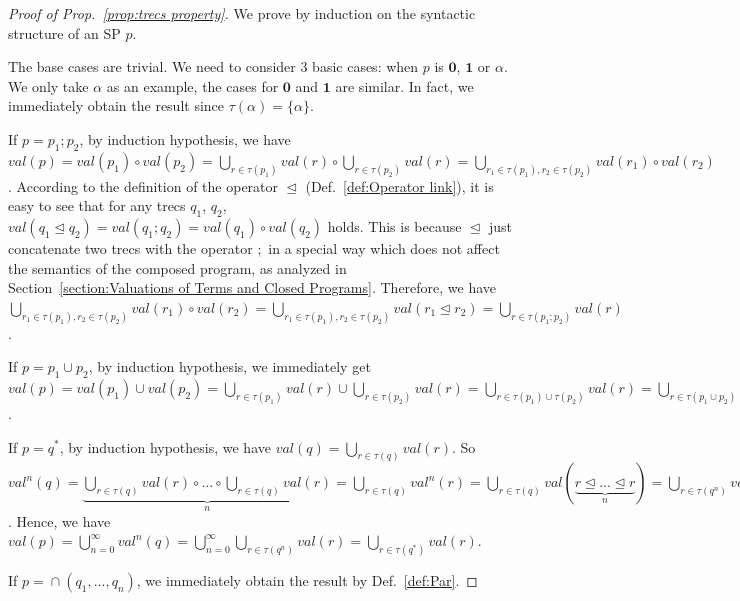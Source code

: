 \documentclass{fcs}
\newcommand{\noth}[0]{\mathbf{1}}
\newcommand{\halt}[0]{\mathbf{0}}
\newcommand{\val}[0]{\mathit{val}}
\DeclareMathOperator{\seq}{;}
\DeclareMathOperator{\para}{\cap}
\DeclareMathOperator{\link}{\unlhd}
\begin{document}
\begin{proof}[Proof of Prop.~\ref{prop:trecs property}]
    We prove by induction on the syntactic structure of an SP $p$.

    The base cases are trivial.
    We need to consider 3 basic cases: when $p$ is $\halt$, $\noth$ or $\alpha$.
    We only take $\alpha$ as an example, the cases for $\halt$ and $\noth$ are similar.
    In fact, we immediately obtain the result since $\tau(\alpha) = \{\alpha\}$.

    If $p = p_1\seq p_2$, by induction hypothesis, we have $\val(p) = \val(p_1)\circ \val(p_2) = \bigcup_{r\in \tau(p_1)}\val(r) \circ \bigcup_{r\in \tau(p_2)}\val(r)=\bigcup_{r_1\in \tau(p_1), r_2\in \tau(p_2)}\val(r_1)\circ \val(r_2)$.
    According to the definition of the operator $\link$ (Def.~\ref{def:Operator link}), it is easy to see that for any trecs $q_1$, $q_2$, $\val(q_1\link q_2)= \val(q_1\seq q_2) = \val(q_1)\circ \val(q_2)$ holds.
    This is because $\link$ just concatenate two trecs with the operator $\seq$ in a special way which does not affect the semantics of the composed program, as analyzed in Section~\ref{section:Valuations of Terms and Closed Programs}.
    Therefore, we have $\bigcup_{r_1\in \tau(p_1), r_2\in \tau(p_2)}\val(r_1)\circ \val(r_2) = \bigcup_{r_1\in \tau(p_1), r_2\in \tau(p_2)}\val(r_1\link r_2) = \bigcup_{r\in \tau(p_1\seq p_2)}\val(r)$.

    If $p=p_1\cup p_2$, by induction hypothesis, we immediately get $\val(p) = \val(p_1)\cup \val(p_2) = \bigcup_{r\in \tau(p_1)}\val(r)\cup \bigcup_{r\in \tau(p_2)}\val(r) = \bigcup_{r\in \tau(p_1)\cup \tau(p_2)}\val(r) = \bigcup_{r\in \tau(p_1\cup p_2)}\val(r)$.

    If $p=q^*$, by induction hypothesis, we have $\val(q) = \bigcup_{r\in \tau(q)}\val(r)$. So $\val^n(q) = \underbrace{\bigcup_{r\in \tau(q)}\val(r)\circ...\circ \bigcup_{r\in \tau(q)}\val(r)}_{n} = \bigcup_{r\in\tau(q)}\val^n(r) = \bigcup_{r\in\tau(q)}\val(\underbrace{r\link...\link r}_{n}) = \bigcup_{r\in \tau(q^n)}\val(r)$. Hence, we have $\val(p) = \bigcup^\infty_{n=0}\val^n(q) = \bigcup^\infty_{n=0}\bigcup_{r\in \tau(q^n)}\val(r) = \bigcup_{r\in \tau(q^*)}\val(r)$.

    If $p=\para(q_1,...,q_n)$, we immediately obtain the result by Def.~\ref{def:Par}.
\end{proof}
\end{document}
